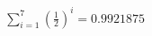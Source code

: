 \documentclass[preview]{standalone}
\begin{document}
\begin{align*}
\sum_{i=1}^{7} \left(\frac{1}{2}\right)^i = {0.9921875}
\end{align*}
\end{document}
